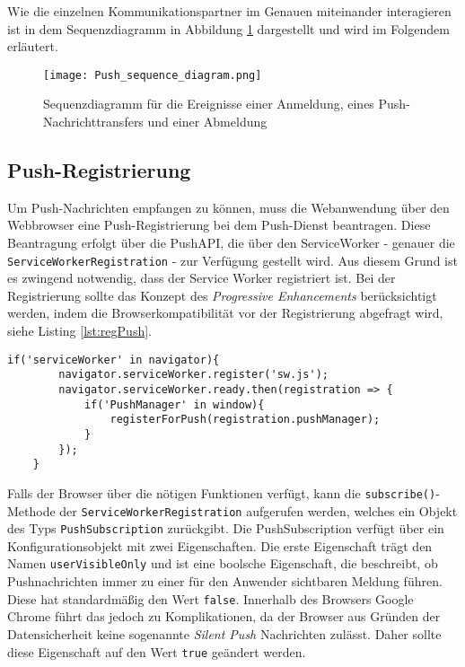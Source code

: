 Wie die einzelnen Kommunikationspartner im Genauen miteinander interagieren ist in dem Sequenzdiagramm in Abbildung \ref{img:sequenceDiagram} dargestellt und wird im Folgendem erläutert. 

\newpage
\begin{figure}[!htb]
    \centering
    \texttt{[image: Push\_sequence\_diagram.png]}
    \caption{Sequenzdiagramm für die Ereignisse einer Anmeldung, eines Push-Nachrichttransfers und einer Abmeldung \cite{PushW3}}
    \label{img:sequenceDiagram}
\end{figure}
\newpage


\subsection{Push-Registrierung}\label{sec:pushRegistrirung}

Um Push-Nachrichten empfangen zu können, muss die Webanwendung über den Webbrowser eine Push-Registrierung bei dem Push-Dienst beantragen. Diese Beantragung erfolgt über die PushAPI, die über den ServiceWorker - genauer die \texttt{ServiceWorkerRegistration} - zur Verfügung gestellt wird. Aus diesem Grund ist es zwingend notwendig, dass der Service Worker registriert ist. 
Bei der Registrierung sollte das Konzept des \textit{Progressive Enhancements} berücksichtigt werden, indem die Browserkompatibilität vor der Registrierung abgefragt wird, siehe Listing \ref{lst:regPush}. 

\begin{lstlisting}[caption={Push-Registrierung unter Berücksichtigung der Konzepte des Progressive Enhancements}, label={lst:regPush}, float={!htb}]
    if('serviceWorker' in navigator){
        navigator.serviceWorker.register('sw.js');
        navigator.serviceWorker.ready.then(registration => {
            if('PushManager' in window){
                registerForPush(registration.pushManager);
            }
        });
    }
\end{lstlisting}



Falls der Browser über die nötigen Funktionen verfügt, kann die \texttt{subscribe()}-Methode der \texttt{ServiceWorkerRegistration} aufgerufen werden, welches ein Objekt des Typs \texttt{PushSubscription} zurückgibt. 
Die PushSubscription verfügt über ein Konfigurationsobjekt mit zwei Eigenschaften. Die erste Eigenschaft trägt den Namen \texttt{userVisibleOnly} und ist eine boolsche Eigenschaft, die  beschreibt, ob Pushnachrichten immer zu einer für den Anwender sichtbaren Meldung führen. Diese hat standardmäßig den Wert \texttt{false}. Innerhalb des Browsers Google Chrome führt das jedoch zu Komplikationen, da der Browser aus Gründen der Datensicherheit keine sogenannte \textit{Silent Push} Nachrichten zulässt. Daher sollte diese Eigenschaft auf den Wert \texttt{true} geändert werden. 

